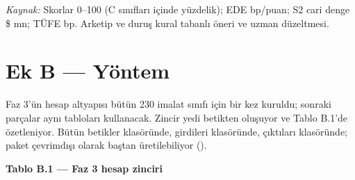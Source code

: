 \emph{Kaynak:} Skorlar 0--100 (C sınıfları içinde yüzdelik); EDE bp/puan; S2 cari denge \$ mn; TÜFE bp. Arketip ve duruş kural tabanlı öneri ve uzman düzeltmesi.

\hypertarget{nace_kartlar_10-12-ek-b--yuxf6ntem}{%
\section{Ek B --- Yöntem}\label{nace_kartlar_10-12-ek-b--yuxf6ntem}}

Faz 3'ün hesap altyapısı bütün 230 imalat sınıfı için bir kez kuruldu; sonraki parçalar aynı tabloları kullanacak. Zincir yedi betikten oluşuyor ve Tablo B.1'de özetleniyor. Bütün betikler  klasöründe, girdileri  klasöründe, çıktıları  klasöründe; paket çevrimdışı olarak baştan üretilebiliyor ().


\textbf{Tablo B.1 --- Faz 3 hesap zinciri}

\nopagebreak[4]

\begingroup\gbtablo\small

